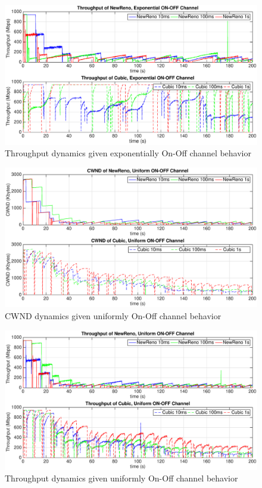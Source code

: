 \begin{figure}
\centering
\includegraphics[width=14cm]{2.eps}
\caption{Throughput dynamics given exponentially On-Off channel behavior}
\label{2nd}
\end{figure}
\begin{figure}
\centering
\includegraphics[width=14cm]{3.eps}
\caption{CWND dynamics given uniformly On-Off channel behavior}
\label{3rd}
\end{figure}
\begin{figure}
\centering
\includegraphics[width=14cm]{4.eps}
\caption{Throughput dynamics given uniformly On-Off channel behavior}
\label{4th}
\end{figure}
